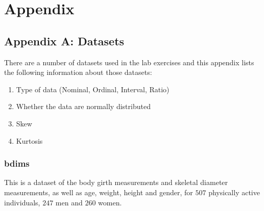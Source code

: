 \chapter{Appendix}

\section{Appendix A: Datasets}\label{app:a}

There are a number of datasets used in the lab exercises and this appendix lists the following information about those datasets: 

\begin{enumerate}
  \item Type of data (Nominal, Ordinal, Interval, Ratio)
  \item Whether the data are normally distributed
  \item Skew
  \item Kurtosis
\end{enumerate}

\subsection{bdims}

This is a dataset of the body girth measurements and skeletal diameter measurements, as well as age, weight, height and gender, for $ 507 $ physically active individuals, $ 247 $ men and $ 260 $ women.

